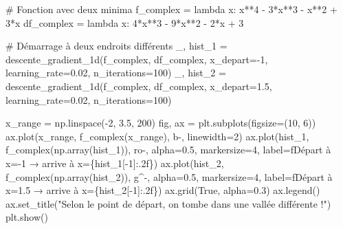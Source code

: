 \documentclass[
  french,
  11pt,
  a4paper,
]{scrbook}
\newenvironment{Shaded}{}{}
\newcommand{\CommentTok}[1]{\textcolor[rgb]{0.42,0.45,0.49}{#1}}
\newcommand{\DecValTok}[1]{\textcolor[rgb]{0.00,0.36,0.77}{#1}}
\newcommand{\FloatTok}[1]{\textcolor[rgb]{0.00,0.36,0.77}{#1}}
\newcommand{\KeywordTok}[1]{\textcolor[rgb]{0.84,0.23,0.29}{#1}}
\newcommand{\NormalTok}[1]{\textcolor[rgb]{0.14,0.16,0.18}{#1}}
\newcommand{\OperatorTok}[1]{\textcolor[rgb]{0.14,0.16,0.18}{#1}}
\newcommand{\SpecialCharTok}[1]{\textcolor[rgb]{0.00,0.36,0.77}{#1}}
\newcommand{\SpecialStringTok}[1]{\textcolor[rgb]{0.01,0.18,0.38}{#1}}
\newcommand{\StringTok}[1]{\textcolor[rgb]{0.01,0.18,0.38}{#1}}
\newcommand{\VariableTok}[1]{\textcolor[rgb]{0.89,0.38,0.04}{#1}}
\begin{document}
\begin{Shaded}
\begin{Highlighting}[]
\CommentTok{\# Fonction avec deux minima}
\NormalTok{f\_complex }\OperatorTok{=} \KeywordTok{lambda}\NormalTok{ x: x}\OperatorTok{**}\DecValTok{4} \OperatorTok{{-}} \DecValTok{3}\OperatorTok{*}\NormalTok{x}\OperatorTok{**}\DecValTok{3} \OperatorTok{{-}}\NormalTok{ x}\OperatorTok{**}\DecValTok{2} \OperatorTok{+} \DecValTok{3}\OperatorTok{*}\NormalTok{x}
\NormalTok{df\_complex }\OperatorTok{=} \KeywordTok{lambda}\NormalTok{ x: }\DecValTok{4}\OperatorTok{*}\NormalTok{x}\OperatorTok{**}\DecValTok{3} \OperatorTok{{-}} \DecValTok{9}\OperatorTok{*}\NormalTok{x}\OperatorTok{**}\DecValTok{2} \OperatorTok{{-}} \DecValTok{2}\OperatorTok{*}\NormalTok{x }\OperatorTok{+} \DecValTok{3}

\CommentTok{\# Démarrage à deux endroits différents}
\NormalTok{\_, hist\_1 }\OperatorTok{=}\NormalTok{ descente\_gradient\_1d(f\_complex, df\_complex, x\_depart}\OperatorTok{={-}}\DecValTok{1}\NormalTok{, learning\_rate}\OperatorTok{=}\FloatTok{0.02}\NormalTok{, n\_iterations}\OperatorTok{=}\DecValTok{100}\NormalTok{)}
\NormalTok{\_, hist\_2 }\OperatorTok{=}\NormalTok{ descente\_gradient\_1d(f\_complex, df\_complex, x\_depart}\OperatorTok{=}\FloatTok{1.5}\NormalTok{, learning\_rate}\OperatorTok{=}\FloatTok{0.02}\NormalTok{, n\_iterations}\OperatorTok{=}\DecValTok{100}\NormalTok{)}

\NormalTok{x\_range }\OperatorTok{=}\NormalTok{ np.linspace(}\OperatorTok{{-}}\DecValTok{2}\NormalTok{, }\FloatTok{3.5}\NormalTok{, }\DecValTok{200}\NormalTok{)}
\NormalTok{fig, ax }\OperatorTok{=}\NormalTok{ plt.subplots(figsize}\OperatorTok{=}\NormalTok{(}\DecValTok{10}\NormalTok{, }\DecValTok{6}\NormalTok{))}
\NormalTok{ax.plot(x\_range, f\_complex(x\_range), }\StringTok{\textquotesingle{}b{-}\textquotesingle{}}\NormalTok{, linewidth}\OperatorTok{=}\DecValTok{2}\NormalTok{)}
\NormalTok{ax.plot(hist\_1, f\_complex(np.array(hist\_1)), }\StringTok{\textquotesingle{}ro{-}\textquotesingle{}}\NormalTok{, alpha}\OperatorTok{=}\FloatTok{0.5}\NormalTok{, markersize}\OperatorTok{=}\DecValTok{4}\NormalTok{, label}\OperatorTok{=}\SpecialStringTok{f\textquotesingle{}Départ à x={-}1 → arrive à x=}\SpecialCharTok{\{}\NormalTok{hist\_1[}\OperatorTok{{-}}\DecValTok{1}\NormalTok{]}\SpecialCharTok{:.2f\}}\SpecialStringTok{\textquotesingle{}}\NormalTok{)}
\NormalTok{ax.plot(hist\_2, f\_complex(np.array(hist\_2)), }\StringTok{\textquotesingle{}g\^{}{-}\textquotesingle{}}\NormalTok{, alpha}\OperatorTok{=}\FloatTok{0.5}\NormalTok{, markersize}\OperatorTok{=}\DecValTok{4}\NormalTok{, label}\OperatorTok{=}\SpecialStringTok{f\textquotesingle{}Départ à x=1.5 → arrive à x=}\SpecialCharTok{\{}\NormalTok{hist\_2[}\OperatorTok{{-}}\DecValTok{1}\NormalTok{]}\SpecialCharTok{:.2f\}}\SpecialStringTok{\textquotesingle{}}\NormalTok{)}
\NormalTok{ax.grid(}\VariableTok{True}\NormalTok{, alpha}\OperatorTok{=}\FloatTok{0.3}\NormalTok{)}
\NormalTok{ax.legend()}
\NormalTok{ax.set\_title(}\StringTok{"Selon le point de départ, on tombe dans une vallée différente !"}\NormalTok{)}
\NormalTok{plt.show()}
\end{Highlighting}
\end{Shaded}
\end{document}

